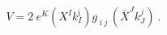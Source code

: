 \begin{equation}\label{Vpot}
  V = 2 \ e^K (X^I k_I^{\bar\imath}) g_{\bar \imath j}\, (\bar X^J
k_J^j) \ .
 \end{equation}

